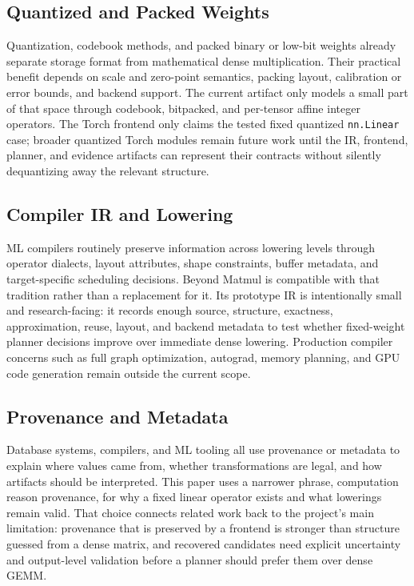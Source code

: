 \documentclass[11pt]{article}
\begin{document}
\subsection{Quantized and Packed Weights}

Quantization, codebook methods, and packed binary or low-bit weights already
separate storage format from mathematical dense multiplication. Their practical
benefit depends on scale and zero-point semantics, packing layout, calibration
or error bounds, and backend support. The current artifact only models a small
part of that space through codebook, bitpacked, and per-tensor affine integer
operators. The Torch frontend only claims the tested fixed quantized
\texttt{nn.Linear} case; broader quantized Torch modules remain future work
until the IR, frontend, planner, and evidence artifacts can represent their
contracts without silently dequantizing away the relevant structure.

\subsection{Compiler IR and Lowering}

ML compilers routinely preserve information across lowering levels through
operator dialects, layout attributes, shape constraints, buffer metadata, and
target-specific scheduling decisions. Beyond Matmul is compatible with that
tradition rather than a replacement for it. Its prototype IR is intentionally
small and research-facing: it records enough
source, structure, exactness, approximation, reuse, layout, and backend
metadata to test whether fixed-weight planner decisions improve over immediate
dense lowering. Production compiler concerns such as full graph optimization,
autograd, memory planning, and GPU code generation remain outside the current
scope.

\subsection{Provenance and Metadata}

Database systems, compilers, and ML tooling all use provenance or metadata to
explain where values came from, whether transformations are legal, and how
artifacts should be interpreted. This paper uses a narrower phrase,
computation reason provenance, for why a fixed linear operator exists and what
lowerings remain valid. That choice connects related work back to the
project's main limitation: provenance that is preserved by a frontend is
stronger than structure guessed from a dense matrix, and recovered candidates
need explicit uncertainty and
output-level validation before a planner should prefer them over dense GEMM.
\end{document}
